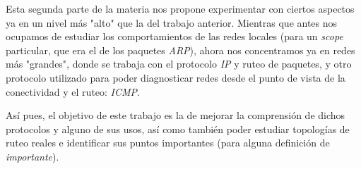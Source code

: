 Esta segunda parte de la materia nos propone experimentar con ciertos
aspectos ya en un nivel m\'as "alto" que la del trabajo anterior. Mientras
que antes nos ocupamos de estudiar los comportamientos de las redes locales
(para un \textit{scope} particular, que era el de los paquetes \textit{ARP}),
ahora nos concentramos ya en redes m\'as "grandes", donde se trabaja
con el protocolo \textit{IP} y ruteo de paquetes, y otro protocolo utilizado
para poder diagnosticar redes desde el punto de vista de la conectividad y el
ruteo: \textit{ICMP}.

\par As\'i pues, el objetivo de este trabajo es la de mejorar la comprensi\'on
de dichos protocolos y alguno de sus usos, as\'i como tambi\'en poder
estudiar topolog\'ias de ruteo\cite{routing} reales e identificar sus puntos
importantes (para alguna definici\'on de \textit{importante}).
